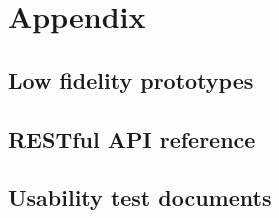 \newpage
\appendix

\section{Appendix}

\subsection{Low fidelity prototypes} \label{app_low_fidelity}

\subsection{RESTful API reference}

\subsection{Usability test documents}